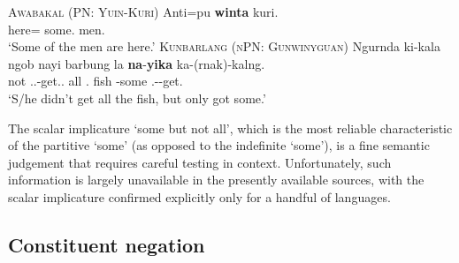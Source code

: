 \documentclass[12pt,egregdoesnotlikesansseriftitles]{scrartcl}
\begin{document}
\begin{exe}
  \ex\label{ex:specsmawa} \textsc{Awabakal (PN: Yuin-Kuri)}\hfill {}
  \gll Anti=pu \textbf{winta} kuri.\\
  here=\Excl{} some.\Abs{} men.\Abs\\
  \glt `Some of the men are here.' %
  \ex\label{ex:specsmwlg} \textsc{Kunbarlang (nPN: Gunwinyguan)}\hfill \citep{ikthesis}
  \gll Ngurnda ki-kala ngob nayi barbung la \textbf{na}-\textbf{yika} ka-(rnak)-kalng.\\
  not \Tsg.\Irr.\Pst-get.\Irr.\Pst{} all \Nm.\Cli{} fish \Conj{} \Cli-some \Tsg.\Nfut-\Lim-get.\Pst\\
  \glt `S/he didn't get all the fish, but only got some.' %
\end{exe}

The scalar implicature `some but not all', which is the most reliable characteristic of the partitive `some' (as opposed to the indefinite `some'), is a fine semantic judgement that requires careful testing in context. Unfortunately, such information is largely unavailable in the presently available sources, with the scalar implicature confirmed explicitly only for a handful of languages. %


\subsection{Constituent negation}
\label{sec:neg}
\end{document}
